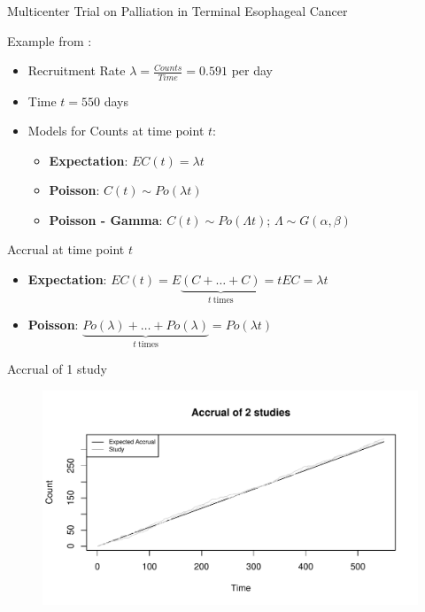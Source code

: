 \documentclass[english]{beamer}\usepackage[]{graphicx}\usepackage[]{xcolor}
\makeatletter
\def\maxwidth{ %
  \ifdim\Gin@nat@width>\linewidth
    \linewidth
  \else
    \Gin@nat@width
  \fi
}
\newenvironment{knitrout}{}{} %
\makeatother
\begin{document}
\begin{frame}{Multicenter Trial on Palliation in Terminal Esophageal Cancer}

Example from \cite{carter2004application}:
\begin{itemize}
\item Recruitment Rate $\lambda = \frac{Counts}{Time} = 0.591$ per day
\item Time $t = 550$ days
\item Models for Counts at time point $t$:
	\begin{itemize}
	\item \textbf{Expectation}: $EC(t) = \lambda t$
	\item \textbf{Poisson}: $C(t) \sim Po(\lambda t)$
	\item \textbf{Poisson - Gamma}: $C(t) \sim Po (\Lambda t)$; $\Lambda \sim G(\alpha,\beta)$
	\end{itemize}
\end{itemize}

\end{frame}




\begin{frame}{Accrual at time point $t$}
\begin{itemize}
\item \textbf{Expectation}: $EC(t) = E\underbrace{(C +\ldots + C)}_{t \ \text{times}} = t E C = \lambda t$
\item \textbf{Poisson}: $\underbrace{Po (\lambda) +\ldots +Po (\lambda)}_{t \ \text{times}} = Po (\lambda t)$
\end{itemize}
\end{frame}


\begin{frame}{Accrual of 1 study}

\begin{figure}

\begin{knitrout}
\color{fgcolor}
\includegraphics[width=\maxwidth]{figures/figunnamed-chunk-3-1} 
\end{knitrout}
 
\end{figure}


\end{frame}
\end{document}
